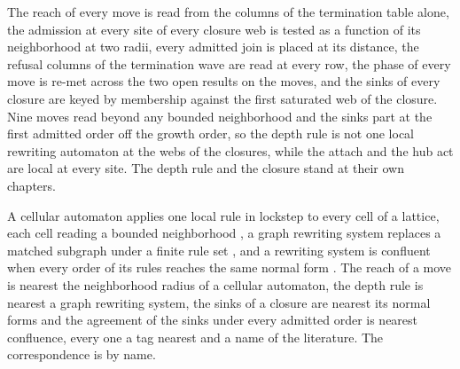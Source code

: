 \chdeps{}{}
The reach of every move is read from the columns of the termination table alone, the admission at every site of every closure web is tested as a function of its neighborhood at two radii, every admitted join is placed at its distance, the refusal columns of the termination wave are read at every row, the phase of every move is re-met across the two open results on the moves, and the sinks of every closure are keyed by membership against the first saturated web of the closure. Nine moves read beyond any bounded neighborhood and the sinks part at the first admitted order off the growth order, so the depth rule is not one local rewriting automaton at the webs of the closures, while the attach and the hub act are local at every site. The depth rule and the closure stand at their own chapters.
\begin{chbridge}
A cellular automaton applies one local rule in lockstep to every cell of a lattice, each cell reading a bounded neighborhood \cite{vonNeumann1966}, a graph rewriting system replaces a matched subgraph under a finite rule set \cite{Rozenberg1997}, and a rewriting system is confluent when every order of its rules reaches the same normal form \cite{Newman1942}. The reach of a move is nearest the neighborhood radius of a cellular automaton, the depth rule is nearest a graph rewriting system, the sinks of a closure are nearest its normal forms and the agreement of the sinks under every admitted order is nearest confluence, every one a tag nearest and a name of the literature. The correspondence is by name.
\end{chbridge}
